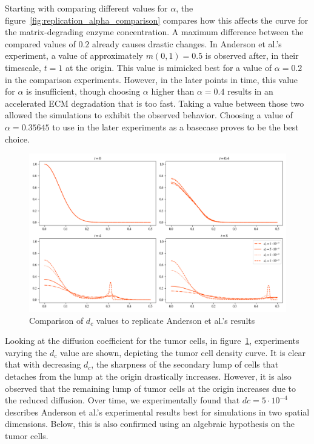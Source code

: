 Starting with comparing different values for $\alpha$, the figure~\ref{fig:replication_alpha_comparison} compares how this affects the curve for the matrix-degrading enzyme concentration. A maximum difference between the compared values of $0.2$ already causes drastic changes. In Anderson et al.'s experiment, a value of approximately $m(0,1)=0.5$ is observed after, in their timescale, $t=1$ at the origin. This value is mimicked best for a value of $\alpha=0.2$ in the comparison experiments. However, in the later points in time, this value for $\alpha$ is insufficient, though choosing $\alpha$ higher than $\alpha=0.4$ results in an accelerated ECM degradation that is too fast. Taking a value between those two allowed the simulations to exhibit the observed behavior. Choosing a value of $\alpha=0.35645$ to use in the later experiments as a basecase proves to be the best choice.

\begin{figure}[!htb]
 \centering
 \includegraphics[width=\textwidth]{resources/images/dc_comparison.png}
 \caption{Comparison of $d_c$ values to replicate Anderson et al.'s results}
 \label{fig:replication_dc_comparison}
\end{figure}

Looking at the diffusion coefficient for the tumor cells, in figure~\ref{fig:replication_dc_comparison}, experiments varying the $d_c$ value are shown, depicting the tumor cell density curve. It is clear that with decreasing $d_c$, the sharpness of the secondary lump of cells that detaches from the lump at the origin drastically increases. However, it is also observed that the remaining lump of tumor cells at the origin increases due to the reduced diffusion. Over time, we experimentally found that $dc=5 \cdot 10^{-4}$ describes Anderson et al.'s experimental results best for simulations in two spatial dimensions. Below, this is also confirmed using an algebraic hypothesis on the tumor cells.

